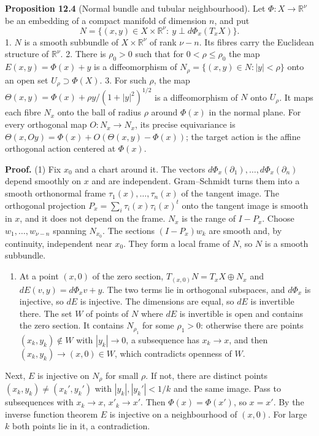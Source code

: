 \documentclass[
  11pt,
]{article}
\providecommand{\tightlist}{%
  \setlength{\itemsep}{0pt}\setlength{\parskip}{0pt}}
\begin{document}
\textbf{Proposition 12.4} (Normal bundle and tubular neighbourhood). Let
\(\Phi:X\to\mathbb R^\nu\) be an embedding of a compact manifold of
dimension \(n\), and put
\[ N=\{(x,y)\in X\times\mathbb R^\nu:\ y\perp d\Phi_x(T_xX)\}. \tag{12.1} \]
1. \(N\) is a smooth subbundle of \(X\times\mathbb R^\nu\) of rank
\(\nu-n\). Its fibres carry the Euclidean structure of
\(\mathbb R^\nu\). 2. There is \(\rho_0>0\) such that for
\(0<\rho\le\rho_0\) the map \(E(x,y)=\Phi(x)+y\) is a diffeomorphism of
\(N_\rho=\{(x,y)\in N:|y|<\rho\}\) onto an open set
\(U_\rho\supset\Phi(X)\). 3. For such \(\rho\), the map
\(\Theta(x,y)=\Phi(x)+\rho y/(1+|y|^2)^{1/2}\) is a diffeomorphism of
\(N\) onto \(U_\rho\). It maps each fibre \(N_x\) onto the ball of
radius \(\rho\) around \(\Phi(x)\) in the normal plane. For every
orthogonal map \(O:N_x\to N_x\), its precise equivariance is
\(\Theta(x,Oy)=\Phi(x)+O(\Theta(x,y)-\Phi(x))\); the target action is
the affine orthogonal action centered at \(\Phi(x)\).

\textbf{Proof.} (1) Fix \(x_0\) and a chart around it. The vectors
\(d\Phi_x(\partial_1),\dots,d\Phi_x(\partial_n)\) depend smoothly on
\(x\) and are independent. Gram--Schmidt turns them into a smooth
orthonormal frame \(\tau_1(x),\dots,\tau_n(x)\) of the tangent image.
The orthogonal projection \(P_x=\sum_i\tau_i(x)\tau_i(x)^{t}\) onto the
tangent image is smooth in \(x\), and it does not depend on the frame.
\(N_x\) is the range of \(I-P_x\). Choose \(w_1,\dots,w_{\nu-n}\)
spanning \(N_{x_0}\). The sections \((I-P_x)w_k\) are smooth and, by
continuity, independent near \(x_0\). They form a local frame of \(N\),
so \(N\) is a smooth subbundle.

\begin{enumerate}
\def\labelenumi{(\arabic{enumi})}
\setcounter{enumi}{1}
\tightlist
\item
  At a point \((x,0)\) of the zero section,
  \(T_{(x,0)}N=T_xX\oplus N_x\) and \(dE(v,y)=d\Phi_x v+y\). The two
  terms lie in orthogonal subspaces, and \(d\Phi_x\) is injective, so
  \(dE\) is injective. The dimensions are equal, so \(dE\) is invertible
  there. The set \(W\) of points of \(N\) where \(dE\) is invertible is
  open and contains the zero section. It contains \(N_{\rho_1}\) for
  some \(\rho_1>0\): otherwise there are points \((x_k,y_k)\notin W\)
  with \(|y_k|\to0\), a subsequence has \(x_k\to x\), and then
  \((x_k,y_k)\to(x,0)\in W\), which contradicts openness of \(W\).
\end{enumerate}

Next, \(E\) is injective on \(N_\rho\) for small \(\rho\). If not, there
are distinct points \((x_k,y_k)\neq(x_k',y_k')\) with
\(|y_k|,|y_k'|<1/k\) and the same image. Pass to subsequences with
\(x_k\to x\), \(x'_k\to x'\). Then \(\Phi(x)=\Phi(x')\), so \(x=x'\). By
the inverse function theorem \(E\) is injective on a neighbourhood of
\((x,0)\). For large \(k\) both points lie in it, a contradiction.
\end{document}
